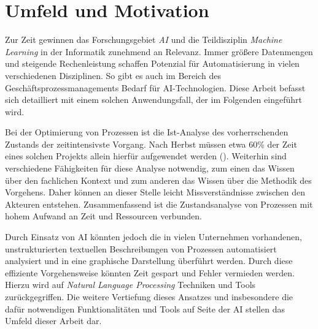 \section{Umfeld und Motivation}

Zur Zeit gewinnen das Forschungsgebiet \textit{\ac{AI}} und die Teildisziplin \textit{Machine Learning} in der Informatik zunehmend an Relevanz. Immer größere Datenmengen und steigende Rechenleistung schaffen Potenzial für Automatisierung in vielen verschiedenen Disziplinen. So gibt es auch im Bereich des Geschäftsprozessmanagements Bedarf für AI-Technologien. Diese Arbeit befasst sich detailliert mit einem solchen Anwendungsfall, der im Folgenden eingeführt wird.\par
Bei der Optimierung von Prozessen ist die Ist-Analyse des vorherrschenden Zustands der zeitintensivste Vorgang. Nach Herbst müssen etwa 60\% der Zeit eines solchen Projekts allein hierfür aufgewendet werden (\cite[vgl.][1]{HERBST}). 
Weiterhin sind verschiedene Fähigkeiten für diese Analyse notwendig, zum einen das Wissen über den fachlichen Kontext und zum anderen das Wissen über die Methodik des Vorgehens. Daher können an dieser Stelle leicht Missverständnisse zwischen den Akteuren entstehen. Zusammenfassend ist die Zustandsanalyse von Prozessen mit hohem Aufwand an Zeit und Ressourcen verbunden.\par
Durch Einsatz von \ac{AI} könnten jedoch die in vielen Unternehmen vorhandenen, unstrukturierten textuellen Beschreibungen von Prozessen automatisiert analysiert und in eine graphische Darstellung überführt werden. Durch diese effiziente Vorgehensweise könnten Zeit gespart und Fehler vermieden werden. Hierzu wird auf \textit{Natural Language Processing} Techniken und Tools zurückgegriffen. Die weitere Vertiefung dieses Ansatzes und insbesondere die dafür notwendigen Funktionalitäten und Tools auf Seite der \ac{AI} stellen das Umfeld dieser Arbeit dar.

